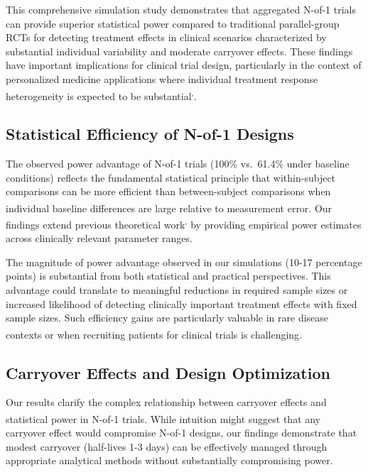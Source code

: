 \documentclass[
  11pt,
]{article}
\begin{document}
This comprehensive simulation study demonstrates that aggregated N-of-1
trials can provide superior statistical power compared to traditional
parallel-group RCTs for detecting treatment effects in clinical
scenarios characterized by substantial individual variability and
moderate carryover effects. These findings have important implications
for clinical trial design, particularly in the context of personalized
medicine applications where individual treatment response heterogeneity
is expected to be
substantial\textsuperscript{,}.

\subsection{Statistical Efficiency of N-of-1
Designs}\label{statistical-efficiency-of-n-of-1-designs}

The observed power advantage of N-of-1 trials (100\% vs.~61.4\% under
baseline conditions) reflects the fundamental statistical principle that
within-subject comparisons can be more efficient than between-subject
comparisons when individual baseline differences are large relative to
measurement
error\textsuperscript{}.
Our findings extend previous theoretical
work\textsuperscript{,}
by providing empirical power estimates across clinically relevant
parameter ranges.

The magnitude of power advantage observed in our simulations (10-17
percentage points) is substantial from both statistical and practical
perspectives. This advantage could translate to meaningful reductions in
required sample sizes or increased likelihood of detecting clinically
important treatment effects with fixed sample sizes. Such efficiency
gains are particularly valuable in rare disease contexts or when
recruiting patients for clinical trials is
challenging\textsuperscript{}.

\subsection{Carryover Effects and Design
Optimization}\label{carryover-effects-and-design-optimization}

Our results clarify the complex relationship between carryover effects
and statistical power in N-of-1
trials\textsuperscript{}.
While intuition might suggest that any carryover effect would compromise
N-of-1 designs, our findings demonstrate that modest carryover
(half-lives 1-3 days) can be effectively managed through appropriate
analytical methods without substantially compromising power.
\end{document}
